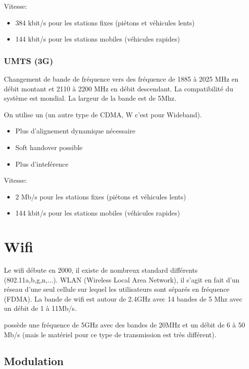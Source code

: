 Vitesse:
\begin{itemize}
\item 384 kbit/s pour les stations fixes (piétons et véhicules lents)
\item 144 kbit/s pour les stations mobiles (véhicules rapides)
\end{itemize}

\subsection{UMTS (3G)}

Changement de bande de fréquence vers des fréquence de 1885 à 2025 MHz en débit montant et 2110 à 2200 MHz en débit descendant. La compatibilité du système est mondial. La largeur de la bande est de 5Mhz.

On utilise un  (un autre type de CDMA, W c'est pour Wideband).
\begin{itemize}
  \item {Plus d'alignement dynamique nécessaire}
  \item {Soft handover possible}
  \item {Plus d'inteférence}
\end{itemize}


Vitesse:
\begin{itemize}
\item 2 Mb/s pour les stations fixes (piétons et véhicules lents)
\item 144 kbit/s pour les stations mobiles (véhicules rapides)
\end{itemize}

\chapter{Wifi}

Le wifi débute en 2000, il existe de nombreux standard différents (802.11a,b,g,n,...). WLAN (Wireless Local Area Network), il s'agit en fait d'un réseau d'une seul cellule sur lequel les utilisateurs sont séparés en fréquence (FDMA). La bande de wifi est autour de 2.4GHz avec 14 bandes de 5 Mhz avec un débit de 1 à 11Mb/s.

 possède une fréquence de 5GHz avec des bandes de 20MHz et un débit de 6 à 50 Mb/s (mais le matériel pour ce type de transmission est très différent).

\section{Modulation}

